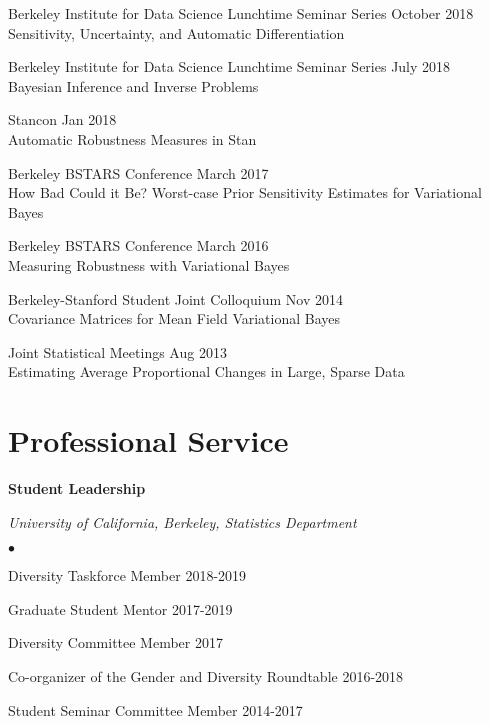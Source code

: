 \documentclass[margin,line]{res}
\newenvironment{list2}{
  \begin{list}{$\bullet$}{%
      \setlength{\itemsep}{0in}
      \setlength{\parsep}{0in} \setlength{\parskip}{0in}
      \setlength{\topsep}{0in} \setlength{\partopsep}{0in}
      \setlength{\leftmargin}{0.2in}}}{\end{list}}
\begin{document}
\begin{resume}


Berkeley Institute for Data Science Lunchtime Seminar Series \hfill October 2018\\
Sensitivity, Uncertainty, and Automatic Differentiation

Berkeley Institute for Data Science Lunchtime Seminar Series \hfill July 2018\\
Bayesian Inference and Inverse Problems

Stancon \hfill Jan 2018\\
Automatic Robustness Measures in Stan


Berkeley BSTARS Conference \hfill March 2017\\
How Bad Could it Be?  Worst-case Prior Sensitivity Estimates for Variational Bayes

Berkeley BSTARS Conference \hfill March 2016\\
Measuring Robustness with Variational Bayes

Berkeley-Stanford Student Joint Colloquium \hfill Nov 2014\\
Covariance Matrices for Mean Field Variational Bayes

Joint Statistical Meetings \hfill Aug 2013\\
Estimating Average Proportional Changes in Large, Sparse Data


\section{\sc Professional Service}

\textbf{Student Leadership}

{\em University of California, Berkeley, Statistics Department}
\begin{list2}
    \item Diversity Taskforce Member \hfill 2018-2019
    \item Graduate Student Mentor \hfill 2017-2019
    \item Diversity Committee Member  \hfill 2017
    \item Co-organizer of the Gender and Diversity Roundtable \hfill 2016-2018
    \item Student Seminar Committee Member \hfill 2014-2017
\end{list2}


\end{resume}
\end{document}
